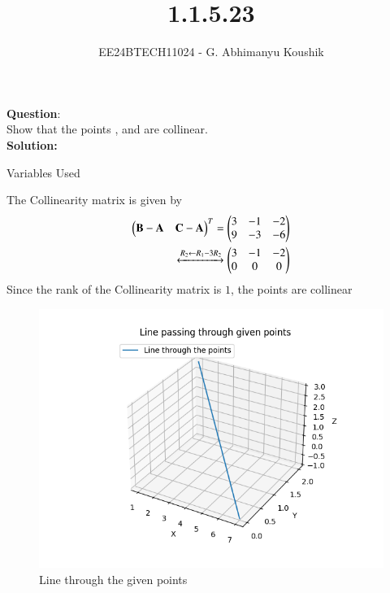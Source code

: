 \documentclass[journal]{IEEEtran}
\begin{document}

\vspace{3cm}

\title{1.1.5.23}
\author{EE24BTECH11024 - G. Abhimanyu Koushik}
{\let\newpage\relax\maketitle}

\renewcommand{\thefigure}{\theenumi}
\renewcommand{\thetable}{\theenumi}
\setlength{\intextsep}{10pt} %


\renewcommand{\thetable}{\theenumi}


\textbf{Question}:\\
Show that the points ,  and  are collinear.
\\
\textbf{Solution: }
\begin{table}[h!]    
  \centering
  
  \caption{Variables Used}
  \label{tab10.5.3.9.1}
\end{table}
The Collinearity matrix is given by\\
\begin{align}
\begin{pmatrix}
   \mathbf{B}-\mathbf{A} & \mathbf{C}-\mathbf{A}
 \end{pmatrix}^T = \begin{pmatrix}
   3 & -1 & -2
   \\
   9 & -3 & -6
   \end{pmatrix}\\
 \xleftrightarrow[]{R_2 \leftarrow {R_1-3R_2}}
 \begin{pmatrix}
   3 & -1 & -2
   \\
   0 & 0 & 0
   \end{pmatrix}
\end{align}
Since the rank of the Collinearity matrix is $1$, the points are collinear
\begin{figure}[h!]
   \centering
   \includegraphics[width=0.7\linewidth]{figs/fig.png}
   \caption{Line through the given points}
   \label{stemplot}
\end{figure}
\end{document}
